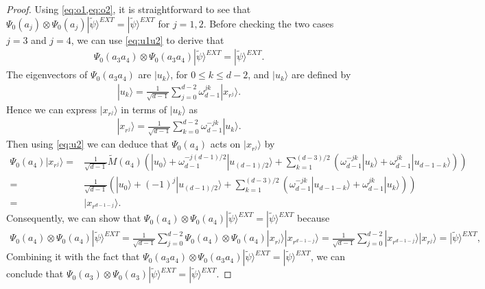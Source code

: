 \documentclass[11pt,letterpaper]{article}
\newcommand{\ket}[1]{|#1\rangle}
\newcommand{\x}{\otimes}
\newcommand{\1}{\mathbb{1}}
\newcommand{\EXT}{EXT}
\newcommand{\tM}{\tilde{M}}
\newcommand{\tpsi}{\tilde{\psi}}
\theoremstyle{definition}
\begin{document}
\begin{proof}
	
	Using \cref{eq:o1,eq:o2}, it is straightforward to see that $\Psi_0(a_j)\x \Psi_0(a_j) \ket{\tpsi}^{\EXT} = \ket{\tpsi}^{\EXT}$ for $j = 1,2$.
	Before checking the two cases $j=3$ and $j=4$, we can use \cref{eq:u1u2} to derive that
	\begin{align*}
		\Psi_0(a_3 a_4) \x\Psi_0(a_3 a_4) \ket{\tpsi}^{\EXT} = \ket{\tpsi}^{\EXT}.
	\end{align*}
	The eigenvectors of $\Psi_0(a_3 a_4)$ are $\ket{u_k}$,
	for $0 \leq k \leq d-2$,
	and $\ket{u_k}$ are defined by
    \begin{align*}
        \ket{u_k} = \frac{1}{\sqrt{d-1}} \sum_{j=0}^{d-2} \omega_{d-1}^{jk} \ket{x_{r^j}}.
    \end{align*}
    Hence we can express $\ket{x_{r^j}}$ in terms of $\ket{u_k}$ as 
    \begin{align*}
        \ket{x_{r^j}} = \frac{1}{\sqrt{d-1}} \sum_{k=0}^{d-2} \omega_{d-1}^{-jk} \ket{u_k}.
    \end{align*}
    Then using \cref{eq:u2} we can deduce that $\Psi_0(a_4)$ acts on $\ket{x_{r^j}}$ by
    \begin{align*}
        \Psi_0(a_4) \ket{x_{r^j}} =& \frac{1}{\sqrt{d-1}} \tM(a_4) \left(\ket{u_0} + \omega_{d-1}^{-j(d-1)/2}\ket{u_{(d-1)/2}}  + 
        \sum_{k=1}^{(d-3)/2} (\omega_{d-1}^{-jk} \ket{u_k} + \omega_{d-1}^{jk} \ket{u_{d-1-k}})\right) \\
        =&\frac{1}{\sqrt{d-1}} \left(\ket{u_0} + (-1)^j\ket{u_{(d-1)/2}}  + 
        \sum_{k=1}^{(d-3)/2} (\omega_{d-1}^{-jk} \ket{u_{d-1-k}} + \omega_{d-1}^{jk} \ket{u_{k}})\right) \\
        =& \ket{x_{r^{d-1-j}}}.
    \end{align*}
    Consequently, we can show that $\Psi_0(a_4) \x \Psi_0(a_4) \ket{\tpsi}^{\EXT} = \ket{\tpsi}^{\EXT}$ 
    because
    \begin{align*}
        \Psi_0(a_4) \x \Psi_0(a_4) \ket{\tpsi}^{\EXT} = \frac{1}{\sqrt{d-1}}  \sum_{j=0}^{d-2} \Psi_0(a_4)\x  \Psi_0(a_4) \ket{x_{r^j}} \ket{x_{r^{d-1-j}}} 
        = \frac{1}{\sqrt{d-1}} \sum_{j=0}^{d-2} \ket{x_{r^{d-1-j}}} \ket{x_{r^{j}}} =\ket{\tpsi}^{\EXT},
    \end{align*}
	Combining it with the fact that $\Psi_0(a_3 a_4) \x \Psi_0(a_3 a_4) \ket{\tpsi}^{\EXT} = \ket{\tpsi}^{\EXT}$, we can conclude that
	$\Psi_0(a_3) \x \Psi_0(a_3) \ket{\tpsi}^{\EXT} = \ket{\tpsi}^{\EXT}$.
\end{proof}


\end{document}
